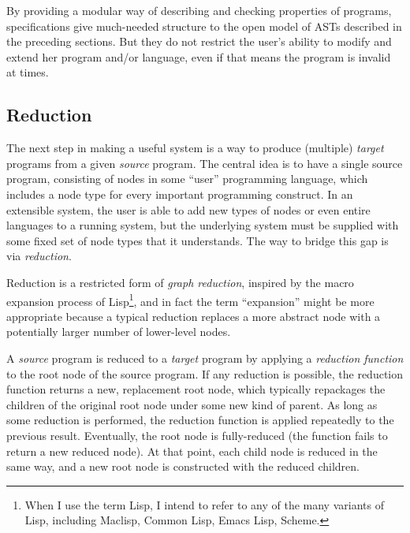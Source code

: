 By providing a modular way of describing and checking properties of programs, specifications give much-needed structure to the open model of ASTs described in the preceding sections. But they do not restrict the user's ability to modify and extend her program and/or language, even if that means the program is invalid at times.


\subsection{Reduction}\label{reduction}
The next step in making a useful system is a way to produce (multiple) \emph{target} programs from a given \emph{source} program. The central idea is to have a single source program, consisting of nodes in some ``user'' programming language, which includes a node type for every important programming construct. In an extensible system, the user is able to add new types of nodes or even entire languages to a running system, but the underlying system must be supplied with some fixed set of node types that it understands. The way to bridge this gap is via \emph{reduction}.

Reduction is a restricted form of \emph{graph reduction}, inspired by the macro expansion process of Lisp\footnote{When I use the term Lisp, I intend to refer to any of the many variants of Lisp, including Maclisp, Common Lisp, Emacs Lisp, Scheme.}, and in fact the term ``expansion'' might be more appropriate because a typical reduction replaces a more abstract node with a potentially larger number of lower-level nodes.

A \emph{source} program is reduced to a \emph{target} program by applying a \emph{reduction function} to the root node of the source program. If any reduction is possible, the reduction function returns a new, replacement root node, which typically repackages the children of the original root node under some new kind of parent. As long as some reduction is performed, the reduction function is applied repeatedly to the previous result. Eventually, the root node is fully-reduced (the function fails to return a new reduced node). At that point, each child node is reduced in the same way, and a new root node is constructed with the reduced children.

